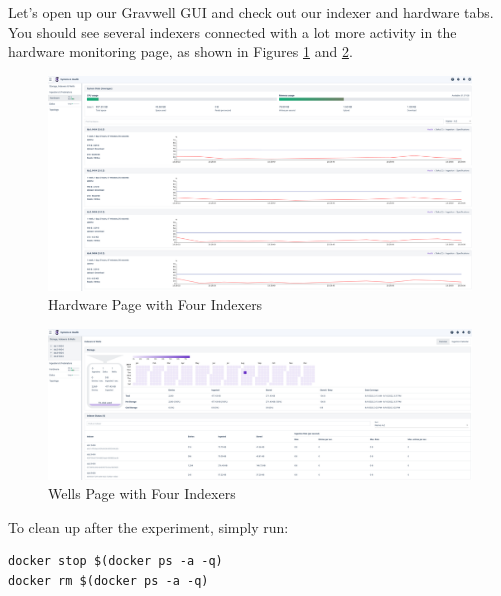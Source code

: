 Let's open up our Gravwell GUI and check out our indexer and hardware
tabs. You should see several indexers connected with a lot more
activity in the hardware monitoring page, as shown in Figures \ref{fig:idx-hardware} and \ref{fig:idx-wells}.

\begin{figure}
	\includegraphics{images/hardware.png}
	\caption{Hardware Page with Four Indexers}
	\label{fig:idx-hardware}
\end{figure}

\begin{figure}
	\includegraphics{images/docker-wells.png}
	\caption{Wells Page with Four Indexers}
	\label{fig:idx-wells}
\end{figure}

To clean up after the experiment, simply run:

\begin{Verbatim}[breaklines=true]
docker stop $(docker ps -a -q)
docker rm $(docker ps -a -q)
\end{Verbatim}
